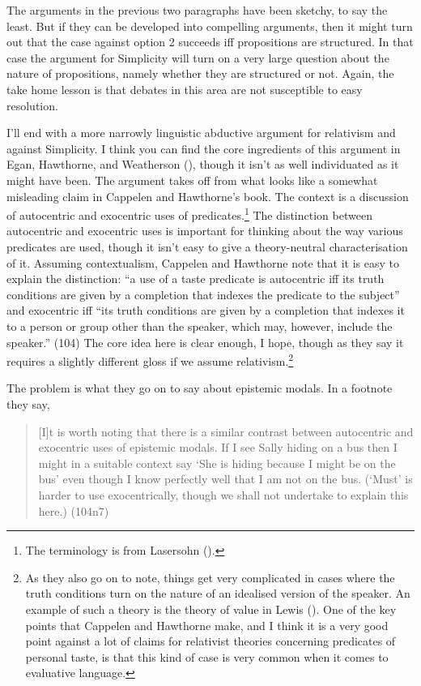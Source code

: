 \documentclass[
  11pt,
  letterpaper,
  DIV=11,
  numbers=noendperiod,
  twoside]{scrartcl}
\begin{document}
The arguments in the previous two paragraphs have been sketchy, to say
the least. But if they can be developed into compelling arguments, then
it might turn out that the case against option 2 succeeds iff
propositions are structured. In that case the argument for Simplicity
will turn on a very large question about the nature of propositions,
namely whether they are structured or not. Again, the take home lesson
is that debates in this area are not susceptible to easy resolution.

I'll end with a more narrowly linguistic abductive argument for
relativism and against Simplicity. I think you can find the core
ingredients of this argument in Egan, Hawthorne, and Weatherson
(), though it isn't as well
individuated as it might have been. The argument takes off from what
looks like a somewhat misleading claim in Cappelen and Hawthorne's book.
The context is a discussion of autocentric and exocentric uses of
predicates.\footnote{The terminology is from Lasersohn
  ().} The distinction between
autocentric and exocentric uses is important for thinking about the way
various predicates are used, though it isn't easy to give a
theory-neutral characterisation of it. Assuming contextualism, Cappelen
and Hawthorne note that it is easy to explain the distinction: ``a use
of a taste predicate is autocentric iff its truth conditions are given
by a completion that indexes the predicate to the subject'' and
exocentric iff ``its truth conditions are given by a completion that
indexes it to a person or group other than the speaker, which may,
however, include the speaker.'' (104) The core idea here is clear
enough, I hope, though as they say it requires a slightly different
gloss if we assume relativism.\footnote{As they also go on to note,
  things get very complicated in cases where the truth conditions turn
  on the nature of an idealised version of the speaker. An example of
  such a theory is the theory of value in Lewis
  (). One of the key points that Cappelen
  and Hawthorne make, and I think it is a very good point against a lot
  of claims for relativist theories concerning predicates of personal
  taste, is that this kind of case is very common when it comes to
  evaluative language.}

The problem is what they go on to say about epistemic modals. In a
footnote they say,

\begin{quote}
{[}I{]}t is worth noting that there is a similar contrast between
autocentric and exocentric uses of epistemic modals. If I see Sally
hiding on a bus then I might in a suitable context say `She is hiding
because I might be on the bus' even though I know perfectly well that I
am not on the bus. (`Must' is harder to use exocentrically, though we
shall not undertake to explain this here.) (104n7)
\end{quote}
\end{document}
